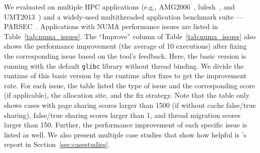 We evaluated \NP{} on multiple HPC applications (e.g.,  AMG2006~\cite{AMG2006}, lulesh~\cite{LULESH}, and UMT2013~\cite{UMT2013}) and a widely-used multithreaded application benchmark suite --- PARSEC~\cite{parsec}.  Applications with NUMA performance issues are listed in Table~\ref{tab:numa_issues}. The ``Improve'' column of Table~\ref{tab:numa_issues} also shows the performance improvement (the average of 10 executions) after fixing the corresponding issue based on the tool's feedback. Here, the basic version is running with the default \texttt{glibc} library  without thread binding. We divide the runtime of this basic version by the runtime after fixes to get the improvement rate. For each issue, the table listed the type of issue and the corresponding score (if applicable), the allocation site, and the fix strategy. Note that the table only shows cases with  page sharing scores larger than 1500 (if without cache false/true sharing), false/true sharing scores larger than 1, and thread migration scores larger than 150. Further, the performance improvement of each specific issue is listed as well. We also present multiple case studies that show how helpful is \NP{}'s report in Section~\ref{sec:casestudies}.   

